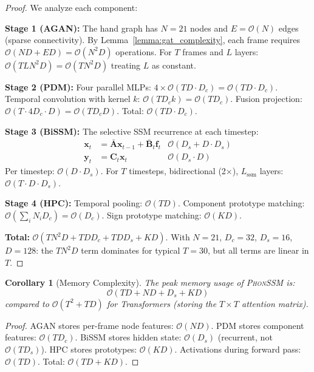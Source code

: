 \documentclass{article}
\newtheorem{corollary}[theorem]{Corollary}
\theoremstyle{definition}
\theoremstyle{remark}
\newcommand{\phonssm}{\textsc{PhonSSM}}
\begin{document}
\begin{proof}
We analyze each component:

\textbf{Stage 1 (AGAN):} The hand graph has $N=21$ nodes and $E = \mathcal{O}(N)$ edges (sparse connectivity). By Lemma~\ref{lemma:gat_complexity}, each frame requires $\mathcal{O}(ND + ED) = \mathcal{O}(N^2 D)$ operations. For $T$ frames and $L$ layers: $\mathcal{O}(TLN^2D) = \mathcal{O}(TN^2D)$ treating $L$ as constant.

\textbf{Stage 2 (PDM):} Four parallel MLPs: $4 \times \mathcal{O}(TD \cdot D_c) = \mathcal{O}(TD \cdot D_c)$. Temporal convolution with kernel $k$: $\mathcal{O}(T D_c k) = \mathcal{O}(TD_c)$. Fusion projection: $\mathcal{O}(T \cdot 4D_c \cdot D) = \mathcal{O}(TD_c D)$. Total: $\mathcal{O}(TD \cdot D_c)$.

\textbf{Stage 3 (BiSSM):} The selective SSM recurrence at each timestep:
\begin{align}
\mathbf{x}_t &= \bar{\mathbf{A}} \mathbf{x}_{t-1} + \bar{\mathbf{B}}_t \mathbf{f}_t & \mathcal{O}(D_s + D \cdot D_s) \\
\mathbf{y}_t &= \mathbf{C}_t \mathbf{x}_t & \mathcal{O}(D_s \cdot D)
\end{align}
Per timestep: $\mathcal{O}(D \cdot D_s)$. For $T$ timesteps, bidirectional (2$\times$), $L_{\text{ssm}}$ layers: $\mathcal{O}(T \cdot D \cdot D_s)$.

\textbf{Stage 4 (HPC):} Temporal pooling: $\mathcal{O}(TD)$. Component prototype matching: $\mathcal{O}(\sum_i N_i D_c) = \mathcal{O}(D_c)$. Sign prototype matching: $\mathcal{O}(KD)$.

\textbf{Total:} $\mathcal{O}(TN^2D + TD D_c + TD D_s + KD)$. With $N=21$, $D_c=32$, $D_s=16$, $D=128$: the $TN^2D$ term dominates for typical $T=30$, but all terms are linear in $T$.
\end{proof}

\begin{corollary}[Memory Complexity]
\label{cor:memory}
The peak memory usage of \phonssm{} is:
\begin{equation}
\mathcal{O}(TD + ND + D_s + KD)
\end{equation}
compared to $\mathcal{O}(T^2 + TD)$ for Transformers (storing the $T \times T$ attention matrix).
\end{corollary}

\begin{proof}
AGAN stores per-frame node features: $\mathcal{O}(ND)$. PDM stores component features: $\mathcal{O}(T D_c)$. BiSSM stores hidden state: $\mathcal{O}(D_s)$ (recurrent, not $\mathcal{O}(TD_s)$). HPC stores prototypes: $\mathcal{O}(KD)$. Activations during forward pass: $\mathcal{O}(TD)$. Total: $\mathcal{O}(TD + KD)$.
\end{proof}
\end{document}
